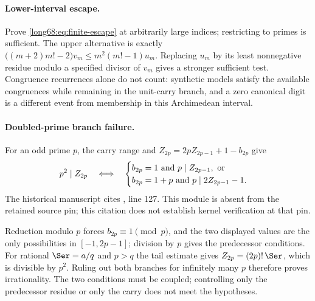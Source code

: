 \paragraph{Lower-interval escape.}
Prove \eqref{long68:eq:finite-escape} at arbitrarily large indices; restricting to
primes is sufficient.  The upper alternative is exactly
$\bigl((m+2)m!-2\bigr)v_m\le m^2(m!-1)u_m$.  Replacing $u_m$ by its least
nonnegative residue modulo a specified divisor of $v_m$ gives a stronger
sufficient test.  Congruence recurrences alone do not count: synthetic models
satisfy the available congruences while remaining in the unit-carry branch,
and a zero canonical digit is a different event from membership in this
Archimedean interval.

\paragraph{Doubled-prime branch failure.}
For an odd prime $p$, the carry range and $Z_{2p}=2pZ_{2p-1}+1-b_{2p}$ give
\begin{equation}\label{long68:eq:doubled-prime}
 p^2\mid Z_{2p}
 \quad\Longleftrightarrow\quad
 \begin{cases}
 b_{2p}=1\ \hbox{and}\ p\mid Z_{2p-1},\ \hbox{or}\\
 b_{2p}=1+p\ \hbox{and}\ p\mid2Z_{2p-1}-1 .
 \end{cases}
\end{equation}
  The historical manuscript cites , line 127. This module is absent from the retained source pin; this citation does not establish kernel verification at that pin.

Reduction modulo $p$ forces $b_{2p}\equiv1\pmod p$, and the two displayed
values are the only possibilities in $[-1,2p-1]$; division by $p$ gives the
predecessor conditions.  For rational $\Ser=a/q$ and $p>q$ the tail estimate
gives $Z_{2p}=(2p)!\,\Ser$, which is divisible by $p^2$.  Ruling out both
branches for infinitely many $p$ therefore proves irrationality.  The two
conditions must be coupled; controlling only the predecessor residue or only
the carry does not meet the hypotheses.

